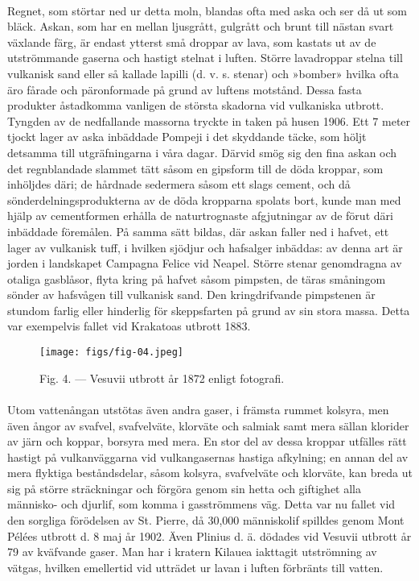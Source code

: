 \documentclass[a4paper, 12pt, oneside, swedish]{article}
\begin{document}
\paragraph{}
Regnet, som störtar ned ur detta moln, blandas ofta med aska och ser då ut som bläck. Askan, som har en mellan ljusgrått, gulgrått och brunt till nästan svart växlande färg, är endast ytterst små droppar av lava, som kastats ut av de utströmmande gaserna och hastigt stelnat i luften. Större lavadroppar stelna till vulkanisk sand eller så kallade lapilli (d. v. s. stenar) och »bomber» hvilka ofta äro fårade och päronformade på grund av luftens motstånd. Dessa fasta produkter åstadkomma vanligen de största skadorna vid vulkaniska utbrott. Tyngden av de nedfallande massorna tryckte in taken på husen 1906. Ett 7 meter tjockt lager av aska inbäddade Pompeji i det skyddande täcke, som höljt detsamma till utgräfningarna i våra dagar. Därvid smög sig den fina askan och det regnblandade slammet tätt såsom en gipsform till de döda kroppar, som inhöljdes däri; de hårdnade sedermera såsom ett slags cement, och då sönderdelningsprodukterna av de döda kropparna spolats bort, kunde man med hjälp av cementformen erhålla de naturtrognaste afgjutningar av de förut däri inbäddade föremålen. På samma sätt bildas, där askan faller ned i hafvet, ett lager av vulkanisk tuff, i hvilken sjödjur och hafsalger inbäddas: av denna art är jorden i landskapet Campagna Felice vid Neapel. Större stenar genomdragna av otaliga gasblåsor, flyta kring på hafvet såsom pimpsten, de täras småningom sönder av hafsvågen till vulkanisk sand. Den kringdrifvande pimpstenen är stundom farlig eller hinderlig för skeppsfarten på grund av sin stora massa. Detta var exempelvis fallet vid Krakatoas utbrott 1883.

\begin{figure}[H]
\centering
\texttt{[image: figs/fig-04.jpeg]}
\caption{Fig. 4. --- Vesuvii utbrott år 1872 enligt fotografi.}
\end{figure}
\paragraph{}
Utom vattenångan utstötas även andra gaser, i främsta rummet kolsyra, men även ångor av svafvel, svafvelväte, klorväte och salmiak samt mera sällan klorider av järn och koppar, borsyra med mera. En stor del av dessa kroppar utfälles rätt hastigt på vulkanväggarna vid vulkangasernas hastiga afkylning; en annan del av mera flyktiga beståndsdelar, såsom kolsyra, svafvelväte och klorväte, kan breda ut sig på större sträckningar och förgöra genom sin hetta och giftighet alla människo- och djurlif, som komma i gasströmmens väg. Detta var nu fallet vid den sorgliga förödelsen av St. Pierre, då 30,000 människolif spilldes genom Mont Pélées utbrott d. 8 maj år 1902. Även Plinius d. ä. dödades vid Vesuvii utbrott år 79 av kväfvande gaser. Man har i kratern Kilauea iakttagit utströmning av vätgas, hvilken emellertid vid utträdet ur lavan i luften förbränts till vatten.
\end{document}
